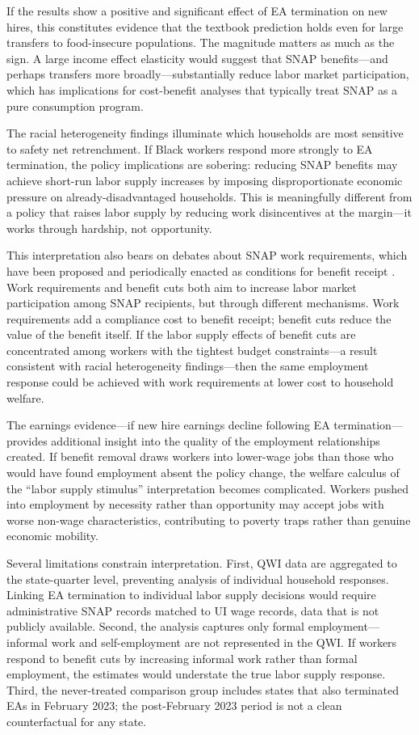 \documentclass[12pt]{article}
\begin{document}
If the results show a positive and significant effect of EA termination on new hires, this constitutes evidence that the textbook prediction holds even for large transfers to food-insecure populations. The magnitude matters as much as the sign. A large income effect elasticity would suggest that SNAP benefits---and perhaps transfers more broadly---substantially reduce labor market participation, which has implications for cost-benefit analyses that typically treat SNAP as a pure consumption program.

The racial heterogeneity findings illuminate which households are most sensitive to safety net retrenchment. If Black workers respond more strongly to EA termination, the policy implications are sobering: reducing SNAP benefits may achieve short-run labor supply increases by imposing disproportionate economic pressure on already-disadvantaged households. This is meaningfully different from a policy that raises labor supply by reducing work disincentives at the margin---it works through hardship, not opportunity.

This interpretation also bears on debates about SNAP work requirements, which have been proposed and periodically enacted as conditions for benefit receipt . Work requirements and benefit cuts both aim to increase labor market participation among SNAP recipients, but through different mechanisms. Work requirements add a compliance cost to benefit receipt; benefit cuts reduce the value of the benefit itself. If the labor supply effects of benefit cuts are concentrated among workers with the tightest budget constraints---a result consistent with racial heterogeneity findings---then the same employment response could be achieved with work requirements at lower cost to household welfare.

The earnings evidence---if new hire earnings decline following EA termination---provides additional insight into the quality of the employment relationships created. If benefit removal draws workers into lower-wage jobs than those who would have found employment absent the policy change, the welfare calculus of the ``labor supply stimulus'' interpretation becomes complicated. Workers pushed into employment by necessity rather than opportunity may accept jobs with worse non-wage characteristics, contributing to poverty traps rather than genuine economic mobility.

Several limitations constrain interpretation. First, QWI data are aggregated to the state-quarter level, preventing analysis of individual household responses. Linking EA termination to individual labor supply decisions would require administrative SNAP records matched to UI wage records, data that is not publicly available. Second, the analysis captures only formal employment---informal work and self-employment are not represented in the QWI. If workers respond to benefit cuts by increasing informal work rather than formal employment, the estimates would understate the true labor supply response. Third, the never-treated comparison group includes states that also terminated EAs in February 2023; the post-February 2023 period is not a clean counterfactual for any state.
\end{document}
